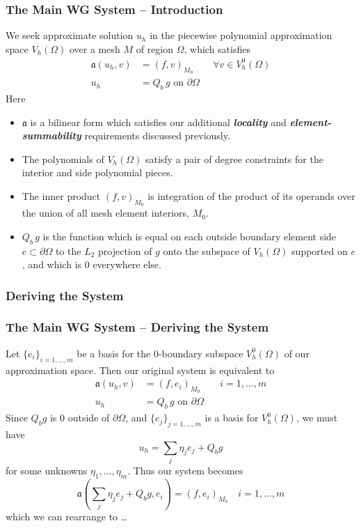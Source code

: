 \documentclass[compress]{beamer}
\begin{document}
\begin{frame}
  \frametitle{The Main WG System -- Introduction}
    We seek approximate solution $u_h$ in the piecewise polynomial approximation space $V_h(\Omega)$ over a mesh $M$ 
    of region $\Omega$, which satisfies
    \begin{align*}
      \mathfrak{a}(u_h,v) & = (f,v)_{M_0}\quad\quad \forall{v} \in V_h^0(\Omega) \\
      u_h & = Q_b\,g \text{ on } \partial\Omega
    \end{align*}
    Here 
    \begin{itemize}[<+->]
      \item $\mathfrak{a}$ is a bilinear form which satisfies our additional \emph{\textbf{locality}} and
        \emph{\textbf{element-summability}} requirements discussed previously.
      \item The polynomials of $V_h(\Omega)$ satisfy a pair of degree constraints for the interior and side polynomial pieces. 
      \item The inner product $(f,v)_{M_0}$ is integration of the product of its operands over the union of all mesh element
        interiors, $M_0$.
      \item $Q_b\,g$ is the function which is equal on each outside boundary element side $e \subset \partial\Omega$ to the 
        $L_2$ projection of $g$ onto the subspace of $V_h(\Omega)$ supported on $e$, and which is $0$ everywhere else.
    \end{itemize}
\end{frame}
    
\subsubsection{Deriving the System}

\begin{frame}
  \frametitle{The Main WG System -- Deriving the System}
  Let $\{e_i\}_{i=1,\dots,m}$ be a basis for the 0-boundary subspace $V_h^0(\Omega)$ of our approximation space.
  Then our original system is equivalent to
  \begin{align*}
    \mathfrak{a}(u_h,v) & = (f,e_i)_{M_0}\quad\quad i=1,\dots,m \\
    u_h & = Q_b\,g \text{ on } \partial\Omega
  \end{align*}
  \pause
  Since $Q_b g$ is $0$ outside of $\partial \Omega$, and $\{e_j\}_{j=1,\dots,m}$ is a basis for $V_h^0(\Omega)$, we must have
  $$u_h = \sum_j{\eta_j e_j} + Q_b g$$
  for some unknowns $\eta_1,\dots,\eta_m.$  
  \pause
  Thus our system becomes
  $$\mathfrak{a}(\sum_j{\eta_j e_j} + Q_b g, e_i) = (f, e_i)_{M_0} \quad i=1,\dots,m$$
  which we can rearrange to \dots
\end{frame}
\end{document}
